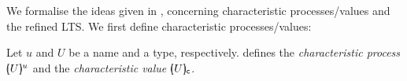 \noi 
We formalise the ideas given in , concerning 
characteristic processes/values and the refined LTS.
We first define characteristic processes/values:

\begin{definition}
	\label{def:char}
	Let $u$ and $U$ be a name and a type, respectively.
	 defines the {\em characteristic process} 
	$[\!\!(U)\!\!]^{u}$ and the {\em characteristic value} $[\!\!(U)\!\!]_{\mathsf{c}}$.
\end{definition}

\begin{figure}
%		 
%		 
%		 
%		 
%		 
%		 
%		  
%		 
%					 
%		 
%		 
% 
%		 


\end{figure}
